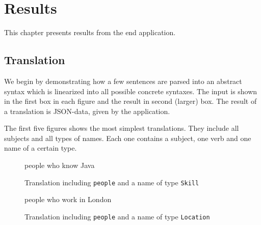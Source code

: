 \chapter{Results}\label{ch:results}
This chapter presents results from the end application.

\section{Translation}
We begin by demonstrating how a few sentences are parsed into an abstract syntax which is linearized into all possible concrete syntaxes. The input is shown in the first box in each figure and the result in second (larger) box. The result of a translation is JSON-data, given by the application.

The first five figures shows the most simplest translations. They include all subjects and all types of names. Each one contains a subject, one verb and one name of a certain type.

\begin{figure}[H]
\begin{terminal}
people who know Java
\end{terminal}
\begin{json-small}
\end{json-small}
\caption{Translation including \texttt{people} and a name of type \texttt{Skill}\label{fig:asts-depths}}
\end{figure}

\begin{figure}[H]
\begin{terminal}
people who work in London
\end{terminal}
\begin{json-small}
\end{json-small}
\caption{Translation including \texttt{people} and a name of type \texttt{Location}\label{fig:asts-depths}}
\end{figure}

